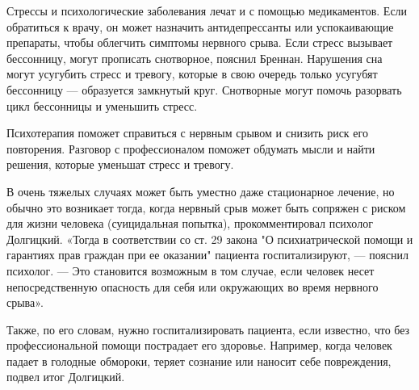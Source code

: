 Стрессы и психологические заболевания лечат и с помощью медикаментов. Если обратиться к врачу, он может назначить антидепрессанты или успокаивающие препараты, чтобы облегчить симптомы нервного срыва. Если стресс вызывает бессонницу, могут прописать снотворное, пояснил Бреннан. Нарушения сна могут усугубить стресс и тревогу, которые в свою очередь только усугубят бессонницу — образуется замкнутый круг. Снотворные могут помочь разорвать цикл бессонницы и уменьшить стресс.

Психотерапия поможет справиться с нервным срывом и снизить риск его повторения. Разговор с профессионалом поможет обдумать мысли и найти решения, которые уменьшат стресс и тревогу.

В очень тяжелых случаях может быть уместно даже стационарное лечение, но обычно это возникает тогда, когда нервный срыв может быть сопряжен с риском для жизни человека (суицидальная попытка), прокомментировал психолог Долгицкий. «Тогда в соответствии со ст. 29 закона "О психиатрической помощи и гарантиях прав граждан при ее оказании" пациента госпитализируют, — пояснил психолог. — Это становится возможным в том случае, если человек несет непосредственную опасность для себя или окружающих во время нервного срыва».

Также, по его словам, нужно госпитализировать пациента, если известно, что без профессиональной помощи пострадает его здоровье. Например, когда человек падает в голодные обмороки, теряет сознание или наносит себе повреждения, подвел итог Долгицкий.